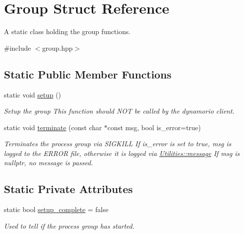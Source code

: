 \hypertarget{struct_group}{\section{Group Struct Reference}
\label{struct_group}
}


A static class holding the group functions.  




{\ttfamily \#include $<$group.\-hpp$>$}

\subsection*{Static Public Member Functions}
\begin{DoxyCompactItemize}
\item 
static void \hyperlink{struct_group_a9e2d7e0c56696de4592f1b166188c10a}{setup} ()
\begin{DoxyCompactList}\small\item\em Setup the group This function should N\-O\-T be called by the dynamorio client. \end{DoxyCompactList}\item 
static void \hyperlink{struct_group_a3538b661d252144dab134aa5aba74b18}{terminate} (const char $\ast$const msg, bool is\-\_\-error=true)
\begin{DoxyCompactList}\small\item\em Terminates the process group via S\-I\-G\-K\-I\-L\-L If is\-\_\-error is set to true, msg is logged to the E\-R\-R\-O\-R file, otherwise it is logged via \hyperlink{class_utilities_ae8efd2e8950fe6641d87296b8120d246}{Utilities\-::message} If msg is nullptr, no message is passed. \end{DoxyCompactList}\end{DoxyCompactItemize}
\subsection*{Static Private Attributes}
\begin{DoxyCompactItemize}
\item 
static bool \hyperlink{struct_group_a35632ca452cfe09fbf723539cd264f58}{setup\-\_\-complete} = false
\begin{DoxyCompactList}\small\item\em Used to tell if the process group has started. \end{DoxyCompactList}\end{DoxyCompactItemize}


